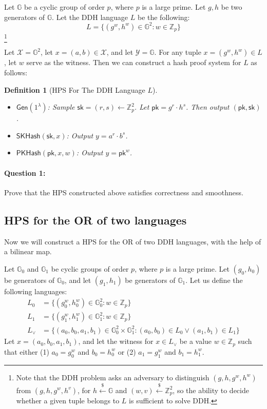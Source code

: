 \documentclass[11pt]{article}
\newtheorem{definition}[theorem]{Definition}
\newenvironment{solution}{\color{blue}\noindent{\bf Solution}\hspace*{1em}}{\qed\medskip}
\newcommand{\qed}{\mbox{}\hspace*{\fill}\nolinebreak\mbox{$\rule{0.6em}{0.6em}$}} %
\numberwithin{equation}{section}
\newcommand{\bbG}{\mathbb{G}}
\newcommand{\bbZ}{\mathbb{Z}}
\newcommand{\cX}{\mathcal{X}}
\newcommand{\cY}{\mathcal{Y}}
\newcommand{\Gen}{\mathsf{Gen}}
\newcommand{\pk}{\mathsf{pk}}
\newcommand{\sk}{\mathsf{sk}}
\newcommand{\secp}{\lambda}
\newcommand{\getsr}{\stackrel{\$}{\gets}}
\newif\ifsol
\begin{document}
Let $\bbG$ be a cyclic group of order $p$, where $p$ is a large prime. Let $g, h$ be two generators of $\bbG$. Let the DDH language $L$ be the following:
\[L = \{(g^w, h^w) \in \bbG^2 : w \in \bbZ_p\}\]
\footnote{Note that the DDH problem asks an adversary to distinguish $(g, h, g^w, h^w)$ from $(g, h, g^w, h^v)$, for $h \getsr \bbG$ and $(w, v) \getsr \bbZ_p^2$, so the ability to decide whether a given tuple belongs to $L$ is sufficient to solve DDH.}

Let $\cX = \bbG^2$, let $x = (a, b) \in \cX$, and let $\cY = \bbG$. For any tuple $x = (g^w, h^w) \in L$, let $w$ serve as the witness. Then we can construct a hash proof system for $L$ as follows:

\begin{definition}[HPS For The DDH Language $L$]\label{def:hps-for-DDH-language}
$ $
\begin{itemize}
    \item $\Gen(1^\secp)$: Sample $\sk = (r, s) \leftarrow \bbZ_p^2$. Let $\pk = g^r \cdot h^s$. Then output $(\pk, \sk)$.
    \item $\mathsf{SKHash}(\sk, x)$: Output $y = a^r \cdot b^s$.
    \item $\mathsf{PKHash}(\pk, x, w)$: Output $y = \pk^w$.
\end{itemize}
\end{definition}

\paragraph{Question 1:} Prove that the HPS constructed above satisfies correctness and smoothness.

\ifsol
\vspace{5mm}
\begin{solution}
TBD
\end{solution}
\fi


\subsection{HPS for the OR of two languages}
Now we will construct a HPS for the OR of two DDH languages, with the help of a bilinear map.

Let $\bbG_0$ and $\bbG_1$ be cyclic groups of order $p$, where $p$ is a large prime. Let $(g_0, h_0)$ be generators of $\bbG_0$, and let $(g_1, h_1)$ be generators of $\bbG_1$. Let us define the following languages:
\begin{align*}
    L_0 &= \{(g_0^{w}, h_0^{w}) \in \bbG_0^2 : w \in \bbZ_p\}\\
    L_1 &= \{(g_1^{w}, h_1^{w}) \in \bbG_1^2 : w \in \bbZ_p\}\\
    L_\lor &= \{(a_0, b_0, a_1, b_1) \in \bbG_0^2 \times \bbG_1^2 : (a_0, b_0) \in L_0 \lor (a_1, b_1) \in L_1\}
\end{align*}
Let $x = (a_0, b_0, a_1, b_1)$, and let the witness for $x \in L_\lor$ be a value $w \in \bbZ_p$ such that either (1) $a_0 = g_0^w$ and $b_0 = h_0^w$ or (2) $a_1 = g_1^w$ and $b_1 = h_1^w$.
\end{document}
